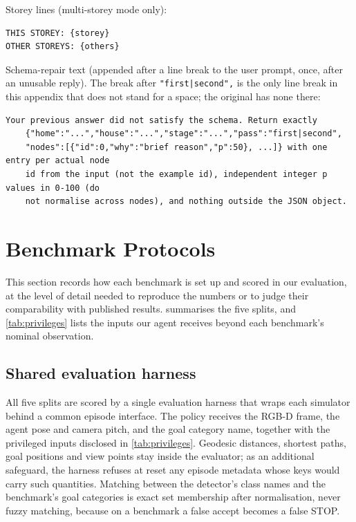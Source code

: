\documentclass[10pt]{article}
\begin{document}
\noindent Storey lines (multi-storey mode only):
\begin{small}
\begin{verbatim}
THIS STOREY: {storey}
OTHER STOREYS: {others}
\end{verbatim}
\end{small}

\noindent Schema-repair text (appended after a line break to the user prompt, once, after an unusable reply). The break after \texttt{"first|second",} is the only line break in this appendix that does not stand for a space; the original has none there:
\begin{small}
\begin{verbatim}
Your previous answer did not satisfy the schema. Return exactly
    {"home":"...","house":"...","stage":"...","pass":"first|second",
    "nodes":[{"id":0,"why":"brief reason","p":50}, ...]} with one entry per actual node
    id from the input (not the example id), independent integer p values in 0-100 (do
    not normalise across nodes), and nothing outside the JSON object.
\end{verbatim}
\end{small}

\section{Benchmark Protocols}\label{app:protocols}

This section records how each benchmark is set up and scored in our evaluation, at the level of detail needed to reproduce the numbers or to judge their comparability with published results.  summarises the five splits, and \cref{tab:privileges} lists the inputs our agent receives beyond each benchmark's nominal observation.

\subsection{Shared evaluation harness}\label{app:protocols-harness}

All five splits are scored by a single evaluation harness that wraps each simulator behind a common episode interface. The policy receives the RGB-D frame, the agent pose and camera pitch, and the goal category name, together with the privileged inputs disclosed in \cref{tab:privileges}. Geodesic distances, shortest paths, goal positions and view points stay inside the evaluator; as an additional safeguard, the harness refuses at reset any episode metadata whose keys would carry such quantities. Matching between the detector's class names and the benchmark's goal categories is exact set membership after normalisation, never fuzzy matching, because on a benchmark a false accept becomes a false STOP.
\end{document}
